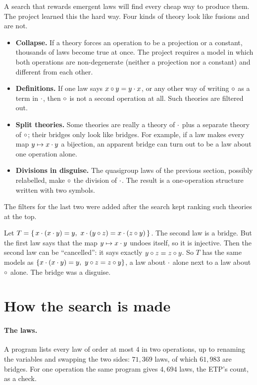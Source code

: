 \documentclass[11pt,a4paper]{article}
\begin{document}
A search that rewards emergent laws will find every cheap way to produce them. The project learned this the hard
way. Four kinds of theory look like fusions and are not.
\begin{itemize}
\item \textbf{Collapse.} If a theory forces an operation to be a projection or a constant, thousands of laws become
  true at once. The project requires a model in which both operations are non-degenerate (neither a projection nor
  a constant) and different from each other.
\item \textbf{Definitions.} If one law says $x\circ y=y\cdot x$, or any other way of writing $\circ$ as a term in $\cdot$,
  then $\circ$ is not a second operation at all. Such theories are filtered out.
\item \textbf{Split theories.} Some theories are really a theory of $\cdot$ plus a separate theory of $\circ$; their
  bridges only look like bridges. For example, if a law makes every map $y\mapsto x\cdot y$ a bijection, an
  apparent bridge can turn out to be a law about one operation alone.
\item \textbf{Divisions in disguise.} The quasigroup laws of the previous section, possibly relabelled, make $\circ$
  the division of $\cdot$. The result is a one-operation structure written with two symbols.
\end{itemize}
The filters for the last two were added after the search kept ranking such theories at the top.

\begin{example}
Let $T=\{\,x\cdot(x\cdot y)=y,\ x\cdot(y\circ z)=x\cdot(z\circ y)\,\}$. The second law is a bridge. But the first law says that the
map $y\mapsto x\cdot y$ undoes itself, so it is injective. Then the second law can be ``cancelled'': it says exactly
$y\circ z=z\circ y$. So $T$ has the same models as $\{x\op(x\op y)=y,\ y\cop z=z\cop y\}$, a law about $\cdot$ alone next to a law
about $\circ$ alone. The bridge was a disguise.
\end{example}


\section{How the search is made}

\paragraph{The laws.} A program lists every law of order at most $4$ in two operations, up to renaming the
variables and swapping the two sides: $71{,}369$ laws, of which $61{,}983$ are bridges. For one operation the same
program gives $4{,}694$ laws, the ETP's count, as a check.
\end{document}
